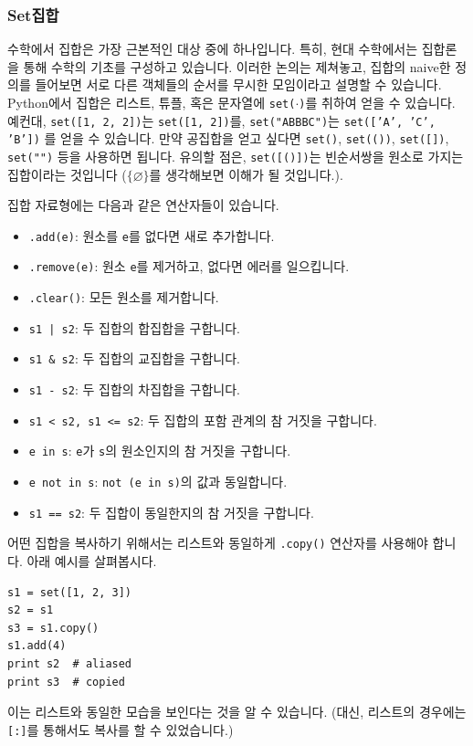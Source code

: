 \documentclass[../main.tex]{subfiles}
\begin{document}
\subsubsection{Set집합}
수학에서 집합은 가장 근본적인 대상 중에 하나입니다.
특히, 현대 수학에서는 집합론을 통해 수학의 기초를 구성하고 있습니다.
이러한 논의는 제쳐놓고, 집합의 naive한 정의를 들어보면 서로 다른 객체들의 순서를 무시한 모임이라고 설명할 수 있습니다.
Python에서 집합은 리스트, 튜플, 혹은 문자열에 \texttt{set($\cdot$)}를 취하여 얻을 수 있습니다.
예컨대, \texttt{set([1, 2, 2])}는 \texttt{set([1, 2])}를, \texttt{set("ABBBC")}는 \texttt{set(['A', 'C', 'B'])} 를 얻을 수 있습니다.
만약 공집합을 얻고 싶다면 \texttt{set()}, \texttt{set(())}, \texttt{set([])}, \texttt{set("")} 등을 사용하면 됩니다.
유의할 점은, \texttt{set([()])}는 빈순서쌍을 원소로 가지는 집합이라는 것입니다 ($\{\varnothing\}$를 생각해보면 이해가 될 것입니다.).

집합 자료형에는 다음과 같은 연산자들이 있습니다.
\begin{itemize}
	\item \texttt{.add(e)}: 원소를 \texttt{e}를 없다면 새로 추가합니다.
	\item \texttt{.remove(e)}: 원소 \texttt{e}를 제거하고, 없다면 에러를 일으킵니다.
	\item \texttt{.clear()}: 모든 원소를 제거합니다.
	\item \texttt{s1 | s2}: 두 집합의 합집합을 구합니다.
	\item \texttt{s1 \& s2}: 두 집합의 교집합을 구합니다.
	\item \texttt{s1 - s2}: 두 집합의 차집합을 구합니다.
	\item \texttt{s1 < s2, s1 <= s2}: 두 집합의 포함 관계의 참 거짓을 구합니다.
	\item \texttt{e in s}: \texttt{e}가 \texttt{s}의 원소인지의 참 거짓을 구합니다.
	\item \texttt{e not in s}: \texttt{not (e in s)}의 값과 동일합니다.
	\item \texttt{s1 == s2}: 두 집합이 동일한지의 참 거짓을 구합니다.
\end{itemize}

어떤 집합을 복사하기 위해서는 리스트와 동일하게 \texttt{.copy()} 연산자를 사용해야 합니다.
아래 예시를 살펴봅시다.
\begin{verbatim}
s1 = set([1, 2, 3])
s2 = s1
s3 = s1.copy()
s1.add(4)
print s2  # aliased
print s3  # copied
\end{verbatim}
이는 리스트와 동일한 모습을 보인다는 것을 알 수 있습니다.
(대신, 리스트의 경우에는 \texttt{[:]}를 통해서도 복사를 할 수 있었습니다.)
\end{document}
